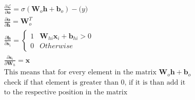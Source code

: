 \documentclass[12pt]{article}
\begin{document}
\begin{description}
\begin{equation}
\begin{aligned}
            \frac{\partial \mathcal{L}}{\partial \mathbf{o}} = \sigma (\mathbf{W}_{o} \mathbf{h} + \mathbf{b}_o) - \mathbf(y)                                                                                                                                                             \\
            \frac{\partial \mathbf{o}}{\partial \mathbf{h}} = \mathbf{W}_o^T                                                                                                                                                                                                              \\
            \frac{\partial \mathbf{h}}{\partial \mathbf{s}_i} = \begin{cases}
              1 & \mathbf{W}_{hi} \mathbf{x}_i + \mathbf{b}_{hi} > 0 \\
              0 & Otherwise
            \end{cases}                                                                                                                                                                                                 \\
            \frac{\partial \mathbf{s}_i}{\partial \mathbf{W}_h} = \mathbf{x}                                                                                                                                                                                                              \\
            \textrm{This means that for every element in the matrix }
            \mathbf{W}_{o} \mathbf{h} + \mathbf{b}_o                                                                                                                                                                                                                                      \\
            \textrm{check if that element is greater than 0, if it is than add it}                                                                                                                                                                                                        \\
            \textrm{to the respective position in the matrix}                                                                                                                                                                                                                             \\                                                                                                                                    \\

\end{aligned}
\end{equation}
\end{description}
\end{document}
